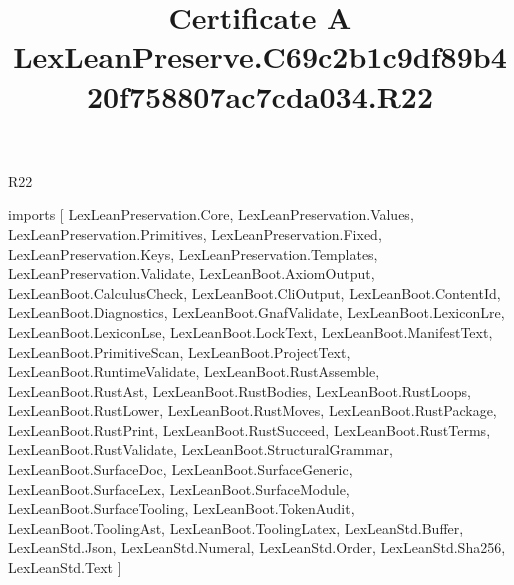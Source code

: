 \begin{lexlean}{R22}
\title{Certificate A LexLeanPreserve.C69c2b1c9df89b420f758807ac7cda034.R22}
\begin{coremodule}
imports [
  LexLeanPreservation.Core,
  LexLeanPreservation.Values,
  LexLeanPreservation.Primitives,
  LexLeanPreservation.Fixed,
  LexLeanPreservation.Keys,
  LexLeanPreservation.Templates,
  LexLeanPreservation.Validate,
  LexLeanBoot.AxiomOutput,
  LexLeanBoot.CalculusCheck,
  LexLeanBoot.CliOutput,
  LexLeanBoot.ContentId,
  LexLeanBoot.Diagnostics,
  LexLeanBoot.GnafValidate,
  LexLeanBoot.LexiconLre,
  LexLeanBoot.LexiconLse,
  LexLeanBoot.LockText,
  LexLeanBoot.ManifestText,
  LexLeanBoot.PrimitiveScan,
  LexLeanBoot.ProjectText,
  LexLeanBoot.RuntimeValidate,
  LexLeanBoot.RustAssemble,
  LexLeanBoot.RustAst,
  LexLeanBoot.RustBodies,
  LexLeanBoot.RustLoops,
  LexLeanBoot.RustLower,
  LexLeanBoot.RustMoves,
  LexLeanBoot.RustPackage,
  LexLeanBoot.RustPrint,
  LexLeanBoot.RustSucceed,
  LexLeanBoot.RustTerms,
  LexLeanBoot.RustValidate,
  LexLeanBoot.StructuralGrammar,
  LexLeanBoot.SurfaceDoc,
  LexLeanBoot.SurfaceGeneric,
  LexLeanBoot.SurfaceLex,
  LexLeanBoot.SurfaceModule,
  LexLeanBoot.SurfaceTooling,
  LexLeanBoot.TokenAudit,
  LexLeanBoot.ToolingAst,
  LexLeanBoot.ToolingLatex,
  LexLeanStd.Buffer,
  LexLeanStd.Json,
  LexLeanStd.Numeral,
  LexLeanStd.Order,
  LexLeanStd.Sha256,
  LexLeanStd.Text
]


\end{coremodule}
\end{lexlean}
